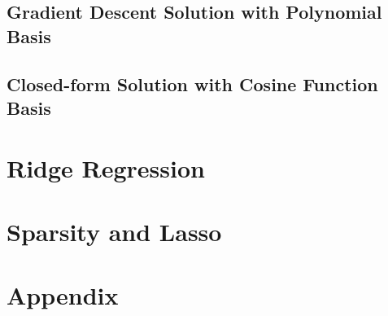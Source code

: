 \documentclass[journal]{IEEEtran}
\begin{document}
\subsection{Gradient Descent Solution with Polynomial Basis}

\subsection{Closed-form Solution with Cosine Function Basis}

\section{Ridge Regression}

\section{Sparsity and Lasso}

\section{Appendix}
\end{document}
